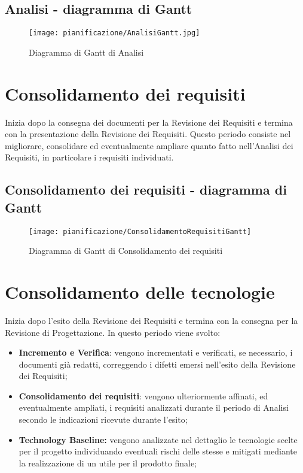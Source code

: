 \documentclass[../PianodiProgetto.tex]{subfiles}
\begin{document}
	\subsection{Analisi - diagramma di Gantt}
	\begin{figure}[H]
		\texttt{[image: pianificazione/AnalisiGantt.jpg]}	
		\caption{Diagramma di Gantt di Analisi}\label{fig:1}	
	\end{figure}
	\newpage
		\section{Consolidamento dei requisiti} Inizia dopo la consegna dei documenti per la Revisione dei Requisiti e termina con la presentazione della Revisione dei Requisiti. Questo periodo consiste nel migliorare, consolidare ed eventualmente ampliare quanto fatto nell'Analisi dei Requisiti, in particolare i requisiti individuati.
	\subsection{Consolidamento dei requisiti - diagramma di Gantt}
	\begin{figure}[H]
		\texttt{[image: pianificazione/ConsolidamentoRequisitiGantt]}	
		\caption{Diagramma di Gantt di Consolidamento dei requisiti}\label{fig:2}
	\end{figure}
	\newpage
	\section{Consolidamento delle tecnologie} Inizia dopo l'esito della Revisione dei Requisiti e termina con la consegna per la Revisione di Progettazione. In questo periodo viene svolto:

	\begin{itemize}	
		\item \textbf{Incremento e Verifica}: vengono incrementati e verificati, se necessario, i documenti già redatti, correggendo i difetti emersi nell'esito della Revisione dei Requisiti;
		\item \textbf{Consolidamento dei requisiti}: vengono ulteriormente affinati, ed eventualmente ampliati, i requisiti analizzati durante il periodo di Analisi secondo le indicazioni ricevute durante l'esito;
		\item \textbf{Technology Baseline:} vengono analizzate nel dettaglio le tecnologie scelte per il progetto individuando eventuali rischi delle stesse e mitigati mediante la realizzazione di un  utile per il prodotto finale;
	\end{itemize}
\end{document}
